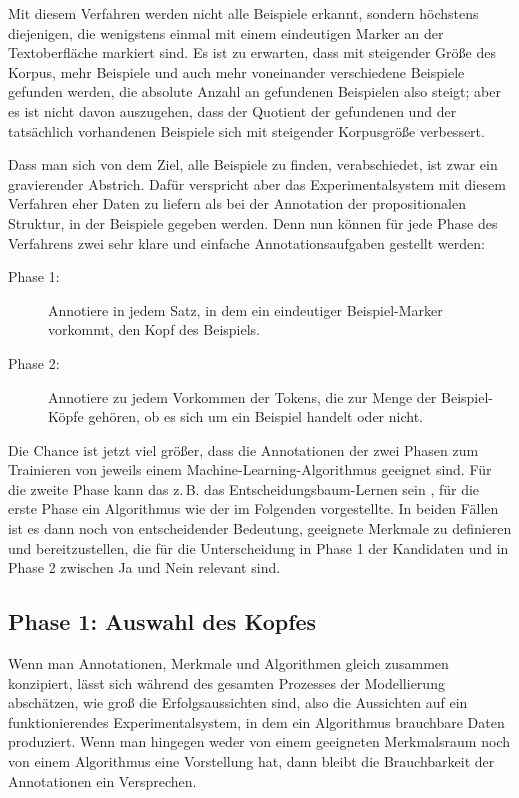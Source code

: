 \documentclass{article}
\begin{document}
Mit diesem Verfahren werden nicht alle Beispiele erkannt, sondern
höchstens diejenigen, die wenigstens einmal mit einem eindeutigen
Marker an der Textoberfläche markiert sind. Es ist zu erwarten, dass
mit steigender Größe des Korpus, mehr Beispiele und auch mehr
voneinander verschiedene Beispiele gefunden werden, die absolute
Anzahl an gefundenen Beispielen also steigt; aber es ist nicht davon
auszugehen, dass der Quotient der gefundenen und der tatsächlich
vorhandenen Beispiele sich mit steigender Korpusgröße verbessert.

Dass man sich von dem Ziel, alle Beispiele zu finden, verabschiedet,
ist zwar ein gravierender Abstrich. Dafür verspricht aber das
Experimentalsystem mit diesem Verfahren eher Daten zu liefern als bei
der Annotation der propositionalen Struktur, in der Beispiele gegeben
werden. Denn nun können für jede Phase des Verfahrens zwei sehr klare
und einfache Annotationsaufgaben gestellt werden:
\begin{description}
\item[Phase 1:] Annotiere in jedem Satz, in dem ein eindeutiger
  Beispiel-Marker vorkommt, den Kopf des Beispiels.
\item[Phase 2:] Annotiere zu jedem Vorkommen der Tokens, die zur Menge
  der Beispiel-Köpfe gehören, ob es sich um ein Beispiel handelt oder
  nicht.
\end{description}
Die Chance ist jetzt viel größer, dass die Annotationen der zwei
Phasen zum Trainieren von jeweils einem Machine-Learning-Algorithmus
geeignet sind. Für die zweite Phase kann das z.\,B. das
Entscheidungsbaum-Lernen sein \parencite[105--120]{Beierle2014a}, für
die erste Phase ein Algorithmus wie der im Folgenden vorgestellte. In
beiden Fällen ist es dann noch von entscheidender Bedeutung, geeignete
Merkmale zu definieren und bereitzustellen, die für die Unterscheidung
in Phase 1 der Kandidaten und in Phase 2 zwischen Ja und Nein relevant
sind.

\subsection{Phase 1: Auswahl des Kopfes}

Wenn man Annotationen, Merkmale und Algorithmen gleich zusammen
konzipiert, lässt sich während des gesamten Prozesses der Modellierung
abschätzen, wie groß die Erfolgsaussichten sind, also die Aussichten
auf ein funktionierendes Experimentalsystem, in dem ein Algorithmus
brauchbare Daten produziert. Wenn man hingegen weder von einem
geeigneten Merkmalsraum noch von einem Algorithmus eine Vorstellung
hat, dann bleibt die Brauchbarkeit %
der Annotationen ein Versprechen.
\end{document}
